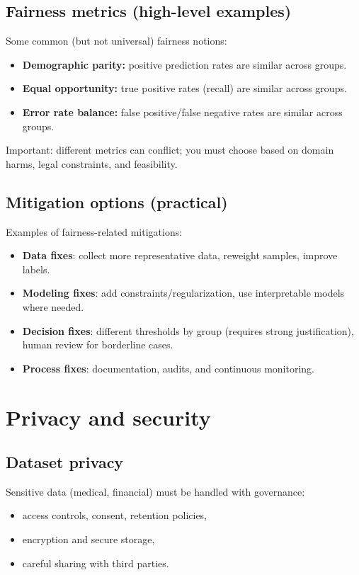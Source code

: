 \documentclass[11pt]{article}
\begin{document}
\subsection{Fairness metrics (high-level examples)}
Some common (but not universal) fairness notions:
\begin{itemize}[leftmargin=*]
  \item \textbf{Demographic parity:} positive prediction rates are similar across groups.
  \item \textbf{Equal opportunity:} true positive rates (recall) are similar across groups.
  \item \textbf{Error rate balance:} false positive/false negative rates are similar across groups.
\end{itemize}
Important: different metrics can conflict; you must choose based on domain harms, legal constraints, and feasibility.

\subsection{Mitigation options (practical)}
Examples of fairness-related mitigations:
\begin{itemize}[leftmargin=*]
  \item \textbf{Data fixes}: collect more representative data, reweight samples, improve labels.
  \item \textbf{Modeling fixes}: add constraints/regularization, use interpretable models where needed.
  \item \textbf{Decision fixes}: different thresholds by group (requires strong justification), human review for borderline cases.
  \item \textbf{Process fixes}: documentation, audits, and continuous monitoring.
\end{itemize}

\section{Privacy and security}
\subsection{Dataset privacy}
Sensitive data (medical, financial) must be handled with governance:
\begin{itemize}[leftmargin=*]
  \item access controls, consent, retention policies,
  \item encryption and secure storage,
  \item careful sharing with third parties.
\end{itemize}
\end{document}
